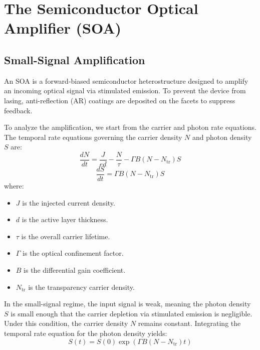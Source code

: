 \section{The Semiconductor Optical Amplifier (SOA)}

\subsection{Small-Signal Amplification}

An SOA is a forward-biased semiconductor heterostructure designed to amplify an incoming optical signal via stimulated emission. To prevent the device from lasing, anti-reflection (AR) coatings are deposited on the facets to suppress feedback. 

To analyze the amplification, we start from the carrier and photon rate equations. The temporal rate equations governing the carrier density $N$ and photon density $S$ are:
\begin{equation*}
    \frac{dN}{dt} = \frac{J}{ed} - \frac{N}{\tau} - \Gamma B(N - N_\text{tr})S
\end{equation*}
\begin{equation*}
    \frac{dS}{dt} = \Gamma B(N - N_\text{tr})S
\end{equation*}
where:
\begin{itemize}
    \item $J$ is the injected current density.
    \item $d$ is the active layer thickness.
    \item $\tau$ is the overall carrier lifetime.
    \item $\Gamma$ is the optical confinement factor.
    \item $B$ is the differential gain coefficient.
    \item $N_\text{tr}$ is the transparency carrier density.
\end{itemize}

In the small-signal regime, the input signal is weak, meaning the photon density $S$ is small enough that the carrier depletion via stimulated emission is negligible. Under this condition, the carrier density $N$ remains constant. Integrating the temporal rate equation for the photon density yields:
\begin{equation*}
    S(t) = S(0)\exp\!\left(\Gamma B(N - N_\text{tr})t\right)
\end{equation*}

